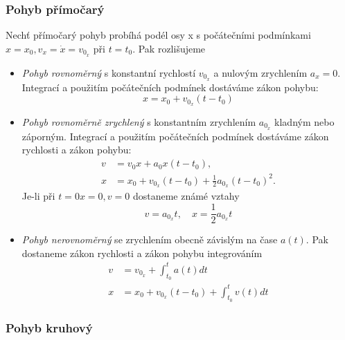 {      \subsubsection{Pohyb přímočarý}
          Nechť přímočarý pohyb probíhá podél osy x s počátečními podmínkami $x = x_0,v_x =
          \dot{x}=v_{0_x}$ při $t = t_0$. Pak rozlišujeme
          \begin{itemize}
            \item \emph{Pohyb rovnoměrný} s konstantní rychlostí $v_{0_x}$ a nulovým zrychlením
                  $a_x=0$. Integrací a použitím počátečních podmínek dostáváme zákon pohybu:
                  \begin{equation}\label{mech:eq_primocar_rovnomer}
                    x=x_0+v_{0_x}(t-t_0)
                  \end{equation}
            \item \emph{Pohyb rovnoměrně zrychlený} s konstantním zrychlením $a_{0_x}$ kladným nebo
                  záporným. Integrací a použitím počátečních podmínek dostáváme zákon ry\-chlo\-sti a
                  zákon pohybu:
                  \begin{align}
                    v &= v_0x+a_0x(t-t_0), \\
                    x &= x_0+v_{0_x}(t-t_0)+\frac{1}{2}a_{0_x}(t-t_0)^2 \label{mech:eq_const_acc}.
                  \end{align}
                  Je-li při $t = 0 x = 0, v = 0$ dostaneme známé vztahy $$v=a_{0_x}t,\quad
                  x=\frac{1}{2}a_{0_x}t$$
            \item \emph{Pohyb nerovnoměrný} se zrychlením obecně závislým na čase $a(t)$. Pak
                  do\-sta\-ne\-me zákon rychlosti a zákon pohybu integrováním
                  \begin{align}
                    v &= v_{0_x}+\int_{t_0}^{t}{a(t)dt} \\
                    x &= x_0+v_{0_x}(t-t_0)+\int_{t_0}^{t}{v(t)dt}
                  \end{align}
          \end{itemize}
      \subsubsection{Pohyb kruhový}
}
